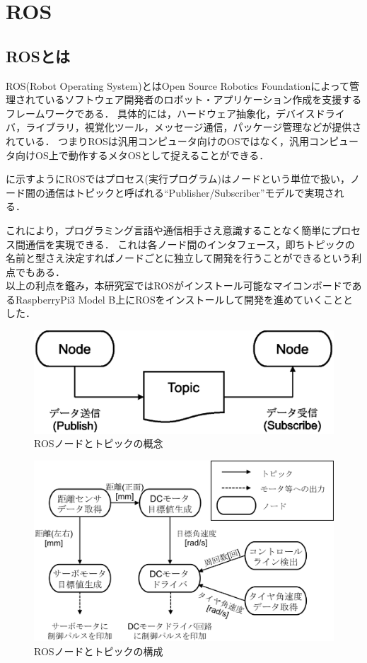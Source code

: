 \section{ROS}
\subsection{ROSとは}
ROS(Robot Operating System)とはOpen Source Robotics Foundationによって管理されているソフトウェア開発者のロボット・アプリケーション作成を支援するフレームワークである．
具体的には，ハードウェア抽象化，デバイスドライバ，ライブラリ，視覚化ツール，メッセージ通信，パッケージ管理などが提供されている．
つまりROSは汎用コンピュータ向けのOSではなく，汎用コンピュータ向けOS上で動作するメタOSとして捉えることができる\cite{kurazume}．

に示すようにROSではプロセス(実行プログラム)はノードという単位で扱い，ノード間の通信はトピックと呼ばれる``Publisher/Subscriber''モデルで実現される\cite{ogura}．

これにより，プログラミング言語や通信相手さえ意識することなく簡単にプロセス間通信を実現できる．
これは各ノード間のインタフェース，即ちトピックの名前と型さえ決定すればノードごとに独立して開発を行うことができるという利点でもある．\\

以上の利点を鑑み，本研究室ではROSがインストール可能なマイコンボードであるRaspberryPi3 Model B上にROSをインストールして開発を進めていくこととした．

\begin{figure}[htb]
  \centering
    \includegraphics[width=0.5\hsize]{picture/eps/ros_topic.eps}
    \caption{ROSノードとトピックの概念}
    \label{fig::ros_topic}
\end{figure}



\begin{figure}[htb]
  \centering
    \includegraphics[width=0.8\hsize]{picture/eps/ros_nodes.eps}
    \caption{ROSノードとトピックの構成}
    \label{fig::ros_nodes}
\end{figure}

